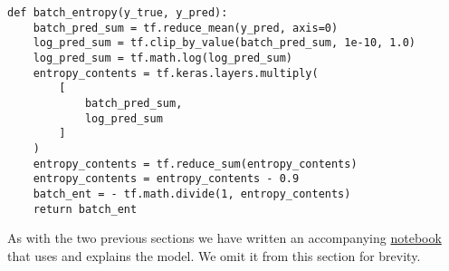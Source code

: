 \begin{minipage}{\linewidth}
\begin{lstlisting}[language=iPython]
def batch_entropy(y_true, y_pred):
    batch_pred_sum = tf.reduce_mean(y_pred, axis=0)
    log_pred_sum = tf.clip_by_value(batch_pred_sum, 1e-10, 1.0)
    log_pred_sum = tf.math.log(log_pred_sum)
    entropy_contents = tf.keras.layers.multiply(
        [
            batch_pred_sum,
            log_pred_sum
        ]
    )
    entropy_contents = tf.reduce_sum(entropy_contents)
    entropy_contents = entropy_contents - 0.9 
    batch_ent = - tf.math.divide(1, entropy_contents)
    return batch_ent
\end{lstlisting}
\end{minipage}

\noindent As with the two previous sections we have written an accompanying \href{https://GitHub.com/ATTPC/VAE-event-classification/blob/master/notebooks/mixae_tutorial.ipynb}{notebook} that uses and explains the model. We omit it from this section for brevity.